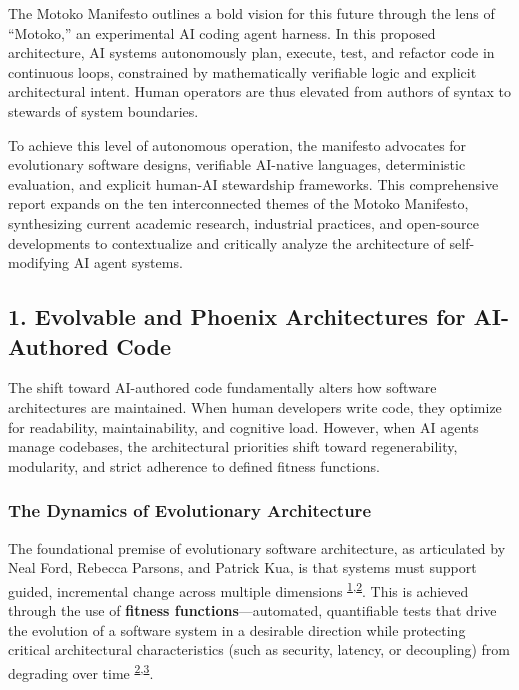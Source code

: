 \documentclass[
  11pt,
]{article}
\begin{document}
The Motoko Manifesto outlines a bold vision for this future through the
lens of ``Motoko,'' an experimental AI coding agent harness. In this
proposed architecture, AI systems autonomously plan, execute, test, and
refactor code in continuous loops, constrained by mathematically
verifiable logic and explicit architectural intent. Human operators are
thus elevated from authors of syntax to stewards of system boundaries.

To achieve this level of autonomous operation, the manifesto advocates
for evolutionary software designs, verifiable AI-native languages,
deterministic evaluation, and explicit human-AI stewardship frameworks.
This comprehensive report expands on the ten interconnected themes of
the Motoko Manifesto, synthesizing current academic research, industrial
practices, and open-source developments to contextualize and critically
analyze the architecture of self-modifying AI agent systems.

\hypertarget{evolvable-and-phoenix-architectures-for-ai-authored-code}{%
\subsection{1. Evolvable and Phoenix Architectures for AI-Authored
Code}\label{evolvable-and-phoenix-architectures-for-ai-authored-code}}

The shift toward AI-authored code fundamentally alters how software
architectures are maintained. When human developers write code, they
optimize for readability, maintainability, and cognitive load. However,
when AI agents manage codebases, the architectural priorities shift
toward regenerability, modularity, and strict adherence to defined
fitness functions.

\hypertarget{the-dynamics-of-evolutionary-architecture}{%
\subsubsection{The Dynamics of Evolutionary
Architecture}\label{the-dynamics-of-evolutionary-architecture}}

The foundational premise of evolutionary software architecture, as
articulated by Neal Ford, Rebecca Parsons, and Patrick Kua, is that
systems must support guided, incremental change across multiple
dimensions
\textsuperscript{\protect\hyperlink{cite-1}{1},\protect\hyperlink{cite-2}{2}}.
This is achieved through the use of \textbf{fitness
functions}---automated, quantifiable tests that drive the evolution of a
software system in a desirable direction while protecting critical
architectural characteristics (such as security, latency, or decoupling)
from degrading over time
\textsuperscript{\protect\hyperlink{cite-2}{2},\protect\hyperlink{cite-3}{3}}.
\end{document}
